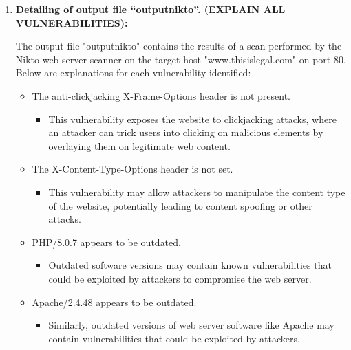 \documentclass[11pt]{article}
\begin{document}
\begin{enumerate}
    \item \textbf{Detailing of output file “outputnikto”. (EXPLAIN ALL VULNERABILITIES):}

          The output file "outputnikto" contains the results of a scan performed by the Nikto web server scanner on the target host "www.thisislegal.com" on port 80. Below are explanations for each vulnerability identified:

          \begin{itemize}
              \item The anti-clickjacking X-Frame-Options header is not present.
                    \begin{itemize}
                        \item This vulnerability exposes the website to clickjacking attacks, where an attacker can trick users into clicking on malicious elements by overlaying them on legitimate web content.
                    \end{itemize}

              \item The X-Content-Type-Options header is not set.
                    \begin{itemize}
                        \item This vulnerability may allow attackers to manipulate the content type of the website, potentially leading to content spoofing or other attacks.
                    \end{itemize}

              \item PHP/8.0.7 appears to be outdated.
                    \begin{itemize}
                        \item Outdated software versions may contain known vulnerabilities that could be exploited by attackers to compromise the web server.
                    \end{itemize}

              \item Apache/2.4.48 appears to be outdated.
                    \begin{itemize}
                        \item Similarly, outdated versions of web server software like Apache may contain vulnerabilities that could be exploited by attackers.
                    \end{itemize}


\end{itemize}
\end{enumerate}
\end{document}
